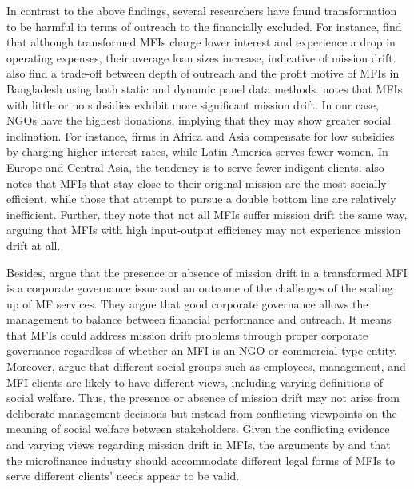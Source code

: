 \documentclass[a4paper,nobind]{templates/ociamthesis}
\begin{document}
In contrast to the above findings, several researchers have found transformation to be harmful in terms of outreach to the financially excluded. For instance, \textcite{d2017ngos} find that although transformed MFIs charge lower interest and experience a drop in operating expenses, their average loan sizes increase, indicative of mission drift. \textcite{mia2017mission} also find a trade-off between depth of outreach and the profit motive of MFIs in Bangladesh using both static and dynamic panel data methods. \textcite{d2013unsubsidized} notes that MFIs with little or no subsidies exhibit more significant mission drift. In our case, NGOs have the highest donations, implying that they may show greater social inclination. For instance, firms in Africa and Asia compensate for low subsidies by charging higher interest rates, while Latin America serves fewer women. In Europe and Central Asia, the tendency is to serve fewer indigent clients. \textcite{bos2015practice} also notes that MFIs that stay close to their original mission are the most socially efficient, while those that attempt to pursue a double bottom line are relatively inefficient. Further, they note that not all MFIs suffer mission drift the same way, arguing that MFIs with high input-output efficiency may not experience mission drift at all.

Besides, \textcite{campion1999institutional} argue that the presence or absence of mission drift in a transformed MFI is a corporate governance issue and an outcome of the challenges of the scaling up of MF services. They argue that good corporate governance allows the management to balance between financial performance and outreach. It means that MFIs could address mission drift problems through proper corporate governance regardless of whether an MFI is an NGO or commercial-type entity. Moreover, \textcite{marti2016financial} argue that different social groups such as employees, management, and MFI clients are likely to have different views, including varying definitions of social welfare. Thus, the presence or absence of mission drift may not arise from deliberate management decisions but instead from conflicting viewpoints on the meaning of social welfare between stakeholders. Given the conflicting evidence and varying views regarding mission drift in MFIs, the arguments by \textcite{morduch1999microfinance} and \textcite{morduch2000microfinance} that the microfinance industry should accommodate different legal forms of MFIs to serve different clients' needs appear to be valid.
\end{document}
